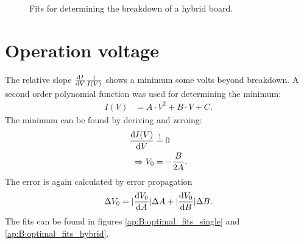 \begin{figure}[H]
	\hfill
	\hfill
	\hfill
	\caption[Breakdown fits (hybrid)]{Fits for determining the breakdown of a hybrid board. }
	\label{ap:B:breakdown_fits_hybrid}
\end{figure}

\newpage

\section{Operation voltage}

The relative slope $\dv{I}{V}\frac{1}{I(V)}$ shows a minimum some volts beyond breakdown. A second order polynomial function was used for determining the minimum:
\begin{align*}
I(V)&=A\cdot V^2+B\cdot V+C.
\end{align*}
The minimum can be found by deriving and zeroing:
\begin{align*}
\dv{I(V)}{V}&\overset{!}{=}0 \\
\Rightarrow V_0&=-\frac{B}{2A}.
\end{align*}
The error is again calculated by error propagation 
\begin{align*}
\Delta V_0=\arrowvert\dv{V_0}{A}\arrowvert\Delta A+\arrowvert\dv{V_0}{B}\arrowvert\Delta B.
\end{align*}
The fits can be found in figures \ref{ap:B:optimal_fits_single} and \ref{ap:B:optimal_fits_hybrid}.

